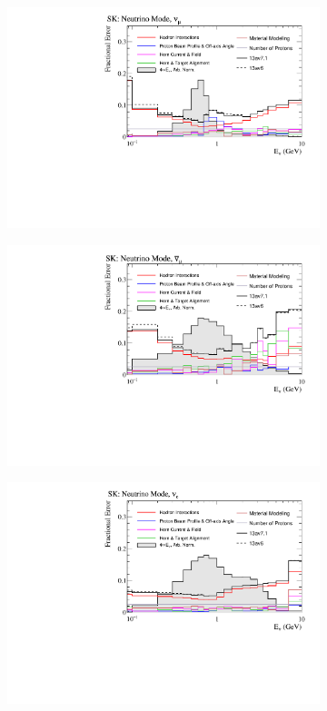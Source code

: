 \begin{figure}
\begin{subfigure}{.49\textwidth}
  \centering
  \includegraphics[width=0.99\linewidth]{figs/flux_error_t2k_sk_fhc_numu}
\end{subfigure}
\begin{subfigure}{.49\textwidth}
  \centering
  \includegraphics[width=0.99\linewidth]{figs/flux_error_t2k_sk_fhc_numubar}
\end{subfigure}
\begin{subfigure}{.49\textwidth}
  \centering
  \includegraphics[width=0.99\linewidth]{figs/flux_error_t2k_sk_fhc_nue}

\end{subfigure}
\end{figure}
